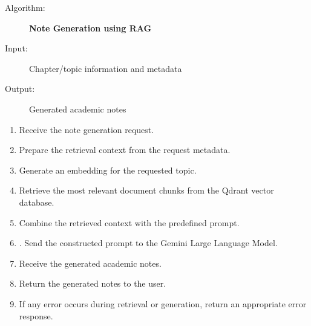 \begin{description}
    \item[Algorithm:] \textbf{Note Generation using RAG}
    \item[Input:] Chapter/topic information and metadata
    \item[Output:] Generated academic notes
\end{description}
\begin{enumerate} 
    \item Receive the note generation request.
    \item Prepare the retrieval context from the request metadata.
    \item Generate an embedding for the requested topic.
    \item Retrieve the most relevant document chunks from the Qdrant vector database.
    \item Combine the retrieved context with the predefined prompt.
    \item. Send the constructed prompt to the Gemini Large Language Model.
    \item Receive the generated academic notes.
    \item Return the generated notes to the user.
    \item If any error occurs during retrieval or generation, return an appropriate error response.
\end{enumerate}